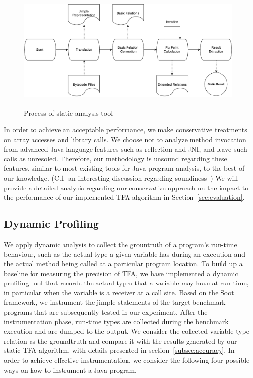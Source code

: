 \documentclass{fac}
\begin{document}
\begin{figure}
\centering
\includegraphics[width=16cm,height=6cm]{static-process.pdf}
\caption{Process of static analysis tool}
\label{fig:static-process}
\end{figure}

In order to achieve an acceptable performance, we make conservative treatments on array accesses and library calls. We choose not to analyze method invocation from advanced Java language features such as reflection and JNI, and leave such calls as unresoled. Therefore, our methodology is unsound regarding these features, similar to most existing tools for Java program analysis, to the best of our knowledge. (C.f.~an interesting discussion regarding soundiness~\cite{LivshitsSSLACGKMV15}) We will provide a detailed analysis regarding our conservative approach on the impact to the performance of our implemented TFA algorithm in Section~\ref{sec:evaluation}.



\subsection{Dynamic Profiling}\label{subsec:dynamic-profiler}

We apply dynamic analysis to collect the grountruth of a program's run-time behaviour, such as the actual type a given variable has during an execution and the actual method being called at a particular program location. To build up a baseline for measuring the precision of TFA, we have implemented a dynamic profiling tool that records the actual types that a variable may have at run-time, in particular when the variable is a receiver at a call site. Based on the Soot framework, we instrument the jimple statements of the target benchmark programs that are subsequently tested in our experiment. After the instrumentation phase, run-time types are collected during the benchmark execution and are dumped to the output. We consider the collected variable-type relation as the groundtruth and compare it with the results generated by our static TFA algorithm, with details presented in section~\ref{subsec:accuracy}. In order to achieve effective instrumentation, we consider the following four possible ways on how to instrument a Java program.
\end{document}
